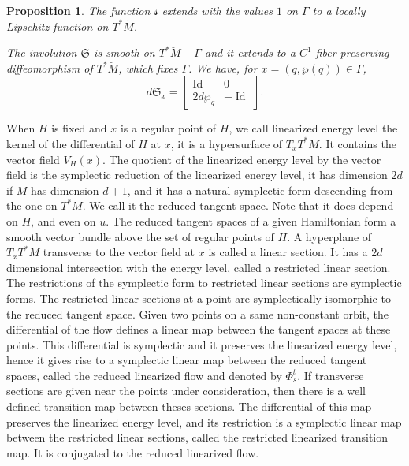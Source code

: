 \documentclass[JEP,XML,SOM,Unicode,published]{cedram}
\DeclareMathOperator{\Id}{Id}
\newcommand{\gS}{\ensuremath{\mathfrak{S}}}
\newcommand{\ms}{\ensuremath{\mathscr{s}}}
\theoremstyle{plain}
\newtheorem{prop}[lem]{Proposition}
\theoremstyle{definition}
\begin{document}
\begin{prop}\label{prop-sym}
The function $\ms$ extends with the values $1$ on $\Gamma$ to a locally Lipschitz function on $T^*\breve M$.

The involution $\gS$ is smooth on $T^*\breve M-\Gamma$ and it extends to a $C^1$ fiber preserving diffeomorphism of $T^*\breve M$, which fixes $\Gamma$. We have, for $x=(q,\wp(q))\in \Gamma$,
\[
d\gS_{x}=\begin{bmatrix}\Id &0\\2d\wp_q & -\Id\end{bmatrix}.
\]
\end{prop}

When $H$ is fixed and $x$ is a regular point of $H$, we call linearized energy level the kernel of the differential of $H$ at $x$, it is a hypersurface of $T_xT^*M$. It contains the vector field $V_H(x)$. The quotient of the linearized energy level by the vector field is the symplectic reduction of the linearized energy level, it has dimension $2d$ if $M$ has dimension $d+1$, and it
has a natural symplectic form descending from the one on $T^*M$. We call it the reduced tangent space.
Note that it does depend on $H$, and even on $u$. The reduced tangent spaces of a given Hamiltonian form a smooth vector bundle above the set of regular points of $H$. A hyperplane of $T_xT^*M$ transverse to the vector field at $x$ is called a linear section. It has a $2d$ dimensional intersection with the energy level, called a restricted linear section.
The restrictions of the symplectic form to restricted linear sections are symplectic forms.
The restricted linear sections at a point are symplectically isomorphic to the reduced tangent space.
Given two points on a same non-constant orbit, the differential of the flow defines a linear map between the tangent spaces at these points. This differential is symplectic and it preserves the linearized energy level, hence it gives rise to a symplectic linear map between the reduced tangent spaces, called the reduced linearized flow and denoted by $\Phi_s^t$.
If transverse sections are given near the points under consideration, then there is a well defined transition map between theses
sections. The differential of this map preserves the linearized energy level, and its restriction is a symplectic linear map between the restricted linear sections, called the restricted linearized transition map.
It is conjugated to the reduced linearized flow.
\end{document}
